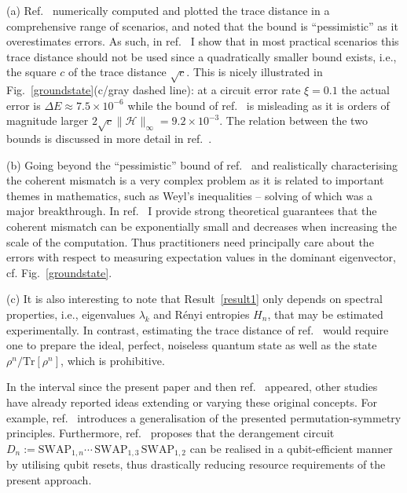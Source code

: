 \documentclass[aps,prx,showpacs,twocolumn,reprint]{revtex4-2}
\newcommand{\tr}{\mathrm{Tr}}
\begin{document}
{	(a) Ref.~\cite{huggins2020virtual} numerically computed and plotted the
	trace distance in a comprehensive range of scenarios, and 
	noted that the bound is ``pessimistic'' as it overestimates errors.
	As such, in ref.~\cite{koczor2021dominant} I show that in most
	practical scenarios this trace distance should not be used	
	since a quadratically smaller bound exists, i.e., the square  $c$ of the trace distance $\sqrt{c}$.
	This is nicely illustrated in Fig.~\ref{groundstate}(c/gray dashed line):
	at a circuit error rate $\xi=0.1$ the actual error is $\Delta E \approx 7.5 \times 10^{-6}$
	while the bound of ref.~\cite{huggins2020virtual} is misleading as it
	is orders of magnitude larger
	$2 \sqrt{c} \lVert \mathcal{H}\rVert_{\infty}= 9.2 \times 10^{-3}$. 
	The relation between the two bounds is discussed in more detail in ref.~\cite{koczor2021dominant}.



	(b) Going beyond the ``pessimistic'' bound of
	ref.~\cite{huggins2020virtual} and realistically characterising 
	the coherent mismatch is a very complex problem
	as it is related to important themes in mathematics, such as Weyl's inequalities
	--  solving of which was a major breakthrough.
	In ref.~\cite{koczor2021dominant} I provide strong theoretical guarantees that the coherent mismatch
	can be exponentially small and decreases when increasing the scale of the computation.
	Thus practitioners need principally care about the errors with respect to measuring expectation values in
	the dominant eigenvector, cf. Fig.~\ref{groundstate}.
	

	(c) It is also interesting to note that Result~\ref{result1} only depends on spectral properties, i.e.,
	eigenvalues $\lambda_k$ and R{\'e}nyi entropies $H_n$,
	that may be estimated experimentally. In contrast, estimating the trace distance of ref.~\cite{huggins2020virtual}
	would require one to prepare
	the ideal, perfect, noiseless quantum state as well as the state $\rho^n/\tr[\rho^n]$, which is prohibitive.

In the interval since the present paper and then ref.~\cite{huggins2020virtual} appeared,
other studies have already reported ideas extending or varying these original concepts.
For example, ref.~\cite{cai2021quantum} introduces a generalisation of the presented
permutation-symmetry principles. Furthermore, ref.~\cite{czarnik2021qubit} proposes that the derangement circuit
$D_n := \mathrm{SWAP}_{1,n} \cdots \, \mathrm{SWAP}_{1,3} \, \mathrm{SWAP}_{1,2}$ can be realised in a
qubit-efficient manner by utilising qubit resets, thus drastically reducing resource requirements
of the present approach.






}
\end{document}

